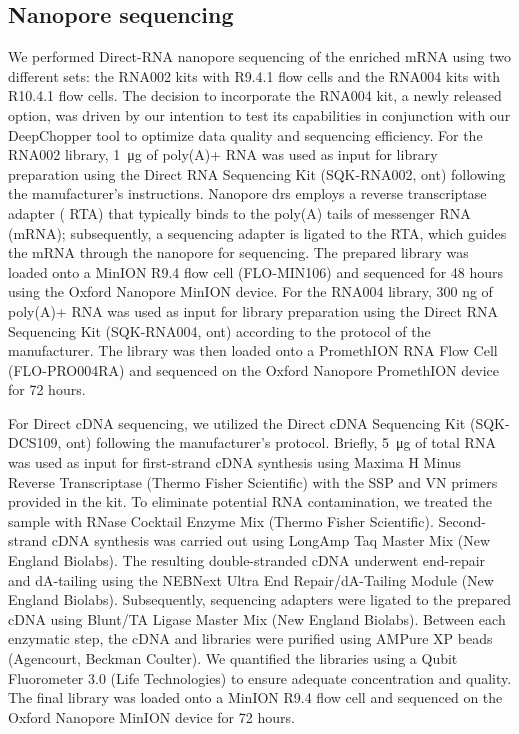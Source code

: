 \documentclass[pdflatex,sn-nature, lineno]{sn-jnl}%
\theoremstyle{thmstyleone}%
\theoremstyle{thmstyletwo}%
\theoremstyle{thmstylethree}%
\begin{document}
\subsection{Nanopore sequencing}

We performed Direct-RNA nanopore sequencing of the enriched mRNA using two different sets: the RNA002 kits with R9.4.1 flow cells and the RNA004 kits with R10.4.1 flow cells.
The decision to incorporate the RNA004 kit, a newly released option, was driven by our intention to test its capabilities in conjunction with our DeepChopper tool to optimize data quality and sequencing efficiency.
For the RNA002 library, \SI{1}{\micro\gram} of poly(A)+ RNA was used as input for library preparation using the Direct RNA Sequencing Kit (SQK-RNA002, \gls{ont}) following the manufacturer's instructions.
Nanopore \gls{drs} employs a reverse transcriptase adapter ( RTA) that typically binds to the poly(A) tails of messenger RNA (mRNA); subsequently, a sequencing adapter is ligated to the RTA, which guides the mRNA through the nanopore for sequencing.
The prepared library was loaded onto a MinION R9.4 flow cell (FLO-MIN106) and sequenced for 48 hours using the Oxford Nanopore MinION device.
For the RNA004 library, 300 ng of poly(A)+ RNA was used as input for library preparation using the Direct RNA Sequencing Kit (SQK-RNA004, \gls{ont}) according to the protocol of the manufacturer.
The library was then loaded onto a PromethION RNA Flow Cell (FLO-PRO004RA) and sequenced on the Oxford Nanopore PromethION device for 72 hours. 

For Direct cDNA sequencing, we utilized the Direct cDNA Sequencing Kit (SQK-DCS109, \gls{ont}) following the manufacturer's protocol.
Briefly, \SI{5}{\micro\gram}  of total RNA was used as input for first-strand cDNA synthesis using Maxima H Minus Reverse Transcriptase (Thermo Fisher Scientific) with the SSP and VN primers provided in the kit.
To eliminate potential RNA contamination, we treated the sample with RNase Cocktail Enzyme Mix (Thermo Fisher Scientific).
Second-strand cDNA synthesis was carried out using LongAmp Taq Master Mix (New England Biolabs).
The resulting double-stranded cDNA underwent end-repair and dA-tailing using the NEBNext Ultra End Repair/dA-Tailing Module (New England Biolabs).
Subsequently, sequencing adapters were ligated to the prepared cDNA using Blunt/TA Ligase Master Mix (New England Biolabs).
Between each enzymatic step, the cDNA and libraries were purified using AMPure XP beads (Agencourt, Beckman Coulter).
We quantified the libraries using a Qubit Fluorometer 3.0 (Life Technologies) to ensure adequate concentration and quality.
The final library was loaded onto a MinION R9.4 flow cell and sequenced on the Oxford Nanopore MinION device for 72 hours.
\end{document}
